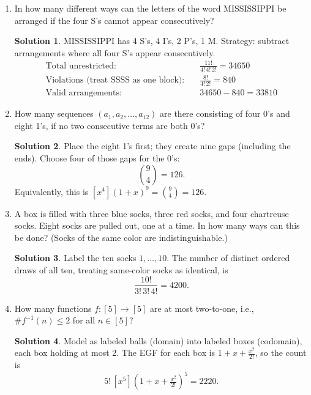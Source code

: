 \documentclass[11pt]{article}
\theoremstyle{definition}
\newtheorem*{solution}{Solution}
\begin{document}
\begin{enumerate}[label=(\alph*)]
  \item In how many different ways can the letters of the word MISSISSIPPI be arranged
    if the four S's cannot appear consecutively?
    \begin{solution}
    MISSISSIPPI has 4 S's, 4 I's, 2 P's, 1 M\@. Strategy: subtract arrangements
    where all four S's appear consecutively.
    \begin{align*}
      \text{Total unrestricted:} &\quad \frac{11!}{4!\,4!\,2!} = 34650 \\
      \text{Violations (treat SSSS as one block):} &\quad \frac{8!}{4!\,2!} = 840 \\
      \text{Valid arrangements:} &\quad 34650 - 840 = 33810
    \end{align*}
    \end{solution}

  \item How many sequences $(a_1, a_2, \ldots, a_{12})$ are there consisting of four 0's and
    eight 1's, if no two consecutive terms are both 0's?
    \begin{solution}
    Place the eight 1's first; they create nine gaps (including the ends).
    Choose four of those gaps for the 0's:
    \[ \binom{9}{4} = 126. \]
    Equivalently, this is $[x^4](1+x)^9 = \binom{9}{4} = 126$.
    \end{solution}

  \item A box is filled with three blue socks, three red socks, and four chartreuse socks.
    Eight socks are pulled out, one at a time. In how many ways can this be done?
    (Socks of the same color are indistinguishable.)
    \begin{solution}
    Label the ten socks $1,\ldots,10$. The number of distinct ordered draws of all
    ten, treating same-color socks as identical, is
    \[ \frac{10!}{3!\,3!\,4!} = 4200. \]
    \end{solution}

  \item How many functions $f:[5]\to[5]$ are at most two-to-one, i.e., $\#f^{-1}(n)\leq 2$
    for all $n\in[5]$?
    \begin{solution}
    Model as labeled balls (domain) into labeled boxes (codomain), each box holding
    at most 2. The EGF for each box is $1 + x + \tfrac{x^2}{2!}$, so the count is
    \[ 5!\,[x^5]\!\left(1 + x + \tfrac{x^2}{2!}\right)^{\!5} = 2220. \]
    \end{solution}
\end{enumerate}
\end{document}
